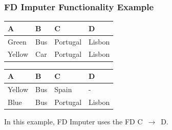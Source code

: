 \documentclass{beamer}
\begin{document}
\begin{frame}
    \frametitle{FD Imputer Functionality Example}
\begin{table}[ht]
    \begin{subtable}[c]{0.9\textwidth}
        \centering
        \begin{tabular}{llll}
            \textsc{A} & \textsc{B} & \textsc{C} & \textsc{D}  \\
        \toprule
        \toprule
            Green & Bus & Portugal & Lisbon \\
            Yellow & Car & Portugal & Lisbon \\
        \bottomrule
        \bottomrule
        \end{tabular}
    \end{subtable}
    \newline
    \vspace*{0.3 cm}
    \newline
\begin{subtable}[c]{0.9\textwidth}
        \centering
        \begin{tabular}{llll}
        \textsc{A} & \textsc{B} & \textsc{C} & \textsc{D} \\
        \toprule
        \toprule
        Yellow & Bus & Spain & - \\
        Blue & Bus & Portugal & Lisbon \\
        \bottomrule
        \bottomrule
        \end{tabular}
    \end{subtable}
\end{table}
In this example, FD Imputer uses the FD \textsc{C}~$\rightarrow$~\textsc{D}.
\end{frame}
\end{document}
